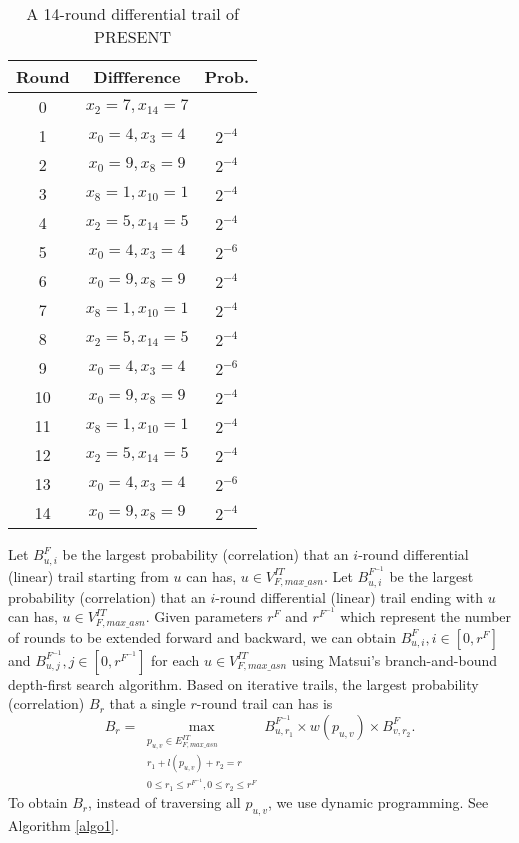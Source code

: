 \begin{table}
	\caption{A 14-round differential trail of PRESENT}\label{tab:trail-present}
	\centering
	\begin{tabular}{|c|c|c|}
		\hline
		Round &  Diffference & Prob.\\
		\hline
		0 &  $x_2=7,x_{14}=7$ & \\
		1 &  $x_0=4,x_3=4$ & $2^{-4}$\\
		2 &  $x_0=9,x_8=9$ & $2^{-4}$\\
		3 &  $x_8=1,x_{10}=1$ & $2^{-4}$\\
		4 &  $x_2=5,x_{14}=5$ & $2^{-4}$\\
		5 &  $x_0=4,x_3=4$ & $2^{-6}$\\
		6 &  $x_0=9,x_8=9$ & $2^{-4}$\\
		7 &  $x_8=1,x_{10}=1$ & $2^{-4}$\\
		8 &  $x_2=5,x_{14}=5$ & $2^{-4}$\\
		9 &  $x_0=4,x_3=4$ & $2^{-6}$\\
		10 &  $x_0=9,x_8=9$ & $2^{-4}$\\
		11 &  $x_8=1,x_{10}=1$ & $2^{-4}$\\
		12 &  $x_2=5,x_{14}=5$ & $2^{-4}$\\
		13 &  $x_0=4,x_3=4$ & $2^{-6}$\\
		14 &  $x_0=9,x_8=9$ & $2^{-4}$\\
		\hline
	\end{tabular}
\end{table}


Let $B^F_{u,i}$ be the largest probability (correlation) that an $i$-round differential (linear) trail starting from $u$ can has, $u\in V^{IT}_{F,max\_asn}$. Let $B^{F^{-1}}_{u,i}$ be the largest probability (correlation) that an $i$-round differential (linear) trail ending with $u$ can has, $u\in V^{IT}_{F,max\_asn}$. Given parameters $r^F$ and $r^{F^{-1}}$ which represent the number of rounds to be extended forward and backward, we can obtain $B^F_{u,i},i\in [0,r^F]$ and $B^{F^{-1}}_{u,j},j\in [0,r^{F^{-1}}]$ for each $u\in V^{IT}_{F,max\_asn}$ using Matsui's branch-and-bound depth-first search algorithm.  Based on iterative trails, the largest probability (correlation) $B_r$ that a single $r$-round trail can has is
\[
    B_r=\max\limits_{\substack{p_{u,v}\in E^{IT}_{F,max\_asn}\\r_1+l(p_{u,v})+r_2=r\\0\leq r_1\leq r^{F^{-1}},0\leq r_2\leq r^F}} B^{F^{-1}}_{u,r_1}\times w(p_{u,v})\times B^F_{v,r_2}.
\]
To obtain $B_r$, instead of traversing all $p_{u,v}$, we use dynamic programming. See Algorithm \ref{algo1}. 

